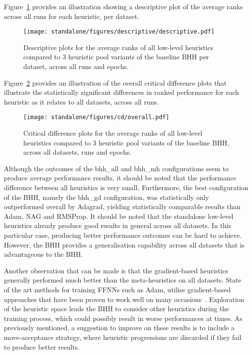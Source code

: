 Figure~\ref{fig:results:standalone:descriptive:descriptive} provides an illustration showing a descriptive plot of the average ranks across all runs for each heuristic, per dataset.

\begin{figure}[H]
	\centering
	\texttt{[image: standalone/figures/descriptive/descriptive.pdf]}
	\caption{Descriptive plots for the average ranks of all low-level heuristics compared to 3 heuristic pool variants of the baseline \Acs{BHH} per dataset, across all runs and epochs.}
	\label{fig:results:standalone:descriptive:descriptive}
\end{figure}

Figure~\ref{fig:results:standalone:descriptive:cd} provides an illustration of the overall critical difference plots that illustrate the statistically significant differences in ranked performance for each heuristic as it relates to all datasets, across all runs.

\begin{figure}[H]
	\centering
	\texttt{[image: standalone/figures/cd/overall.pdf]}
	\caption{Critical difference plots for the average ranks of all low-level heuristics compared to 3 heuristic pool variants of the baseline \acs{BHH}, across all datasets, runs and epochs.}
	\label{fig:results:standalone:descriptive:cd}
\end{figure}

Although the outcomes of the bhh\_all and bhh\_mh configurations seem to produce average performance results, it should be noted that the performance difference between all heuristics is very small. Furthermore, the best configuration of the \acs{BHH}, namely the bhh\_gd configuration, was statistically only outperformed overall by \acs{Adagrad}, yielding statistically comparable results than \acs{Adam}, \acs{NAG} and \acs{RMSProp}. It should be noted that the standalone low-level  heuristics already produce good results in general across all datasets. In this particular case, producing better performance outcomes can be hard to achieve. However, the \acs{BHH} provides a generalisation capability across all datasets that is advantageous to the \acs{BHH}.

Another observation that can be made is that the gradient-based heuristics generally performed much better than the meta-heuristics on all datasets. State of the art methods for training \acp{FFNN} such as \acs{Adam}, utilise gradient-based approaches that have been proven to work well on many occasions~\cite{ref:kingma:2014}. Exploration of the heuristic space leads the \acs{BHH} to consider other heuristics during the training process, which could possibly result in worse performances at times. As previously mentioned, a suggestion to improve on these results is to include a move-acceptance strategy, where heuristic progressions are discarded if they fail to produce better results.

